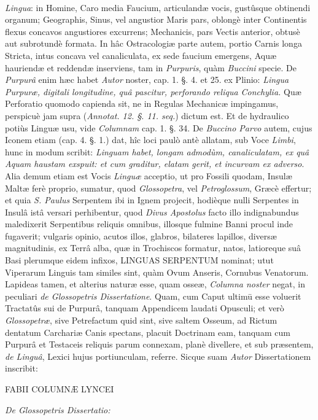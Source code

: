\documentclass[a4paper, 11pt, oneside, polutonikogreek, german]{article}
\begin{document}
\paragraph{}
\emph{Lingua}: in Homine, Caro media Faucium, articulandæ vocis, gustûsque obtinendi organum; Geographis, Sinus, vel angustior Maris pars, oblongè inter Continentis flexus concavos angustiores excurrens; Mechanicis, pars Vectis anterior, obtusè aut subrotundè formata. In hâc Ostracologiæ parte autem, portio Carnis longa Stricta, intus concava vel canaliculata, ex sede faucium emergens, Aquæ hauriendæ et reddendæ inserviens, tam in \emph{Purpuris}, quàm \emph{Buccini} specie. De \emph{Purpurâ} enim hæc habet \emph{Autor} noster, cap. 1. §. 4. et 25. ex Plinio: \emph{Lingua Purpuræ, digitali longitudine, quâ pascitur, perforando reliqua Conchylia.} Quæ Perforatio quomodo capienda sit, ne in Regulas Mechanicæ impingamus, perspicuè jam supra (\emph{Annotat. 12. §. 11. seq.}) dictum est. Et de hydraulico potiùs Linguæ usu, vide \emph{Columnam} cap. 1. §. 34. De \emph{Buccino Parvo} autem, cujus Iconem etiam (cap. 4. §. 1.) dat, hîc loci paulò antè allatam, sub Voce \emph{Limbi}, hunc in modum scribit: \emph{Linguam habet, longam admodùm, canaliculatam, ex quâ Aquam haustam exspuit: et cum graditur, elatam gerit, et incurvam ex adverso}. Alia demum etiam est Vocis \emph{Linguæ} acceptio, ut pro Fossili quodam, Insulæ Maltæ ferè proprio, sumatur, quod \emph{Glossopetra}, vel \emph{Petroglossum}, Græcè effertur; et quia \emph{S. Paulus} Serpentem ibi in Ignem projecit, hodièque nulli Serpentes in Insulâ istâ versari perhibentur, quod \emph{Divus Apostolus} facto illo indignabundus maledixerit Serpentibus reliquis omnibus, illosque fulmine Banni procul inde fugaverit; vulgaris opinio, acutos illos, glabros, bilateres lapillos, diversæ magnitudinis, ex Terrâ alba, quæ in Trochiscos formatur, natos, latioreque suâ Basi plerumque eidem infixos, LINGUAS SERPENTUM nominat; utut Viperarum Linguis tam similes sint, quàm Ovum Anseris, Cornubus Venatorum. Lapideas tamen, et alterius naturæ esse, quam osseæ, \emph{Columna noster} negat, in peculiari \emph{de Glossopetris Dissertatione}. Quam, cum Caput ultimū esse voluerit Tractatûs sui de Purpurâ, tanquam Appendicem laudati Opusculi; et verò \emph{Glossopetræ}, sive Petrefactum quid sint, sive saltem Osseum, ad Rictum dentatum Carchariæ Canis spectans, placuit Doctrinam eam, tanquam cum Purpurâ et Testaceis reliquis parum connexam, planè divellere, et sub præsentem, \emph{de Linguâ}, Lexici hujus portiunculam, referre. Sicque suam \emph{Autor} Dissertationem inscribit:
\begin{center}
FABII COLUMNÆ LYNCEI

\emph{De Glossopetris Dissertatio:}
\end{center}
\end{document}

